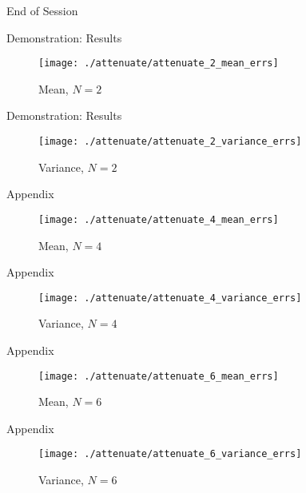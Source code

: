 \documentclass[t,9pt,svgnames]{beamer}
\begin{document}
\begin{frame}{End of Session}
\end{frame}

\begin{frame}{Demonstration: Results}
      \begin{figure}
        \centering
        \texttt{[image: ./attenuate/attenuate\_2\_mean\_errs]}
        \caption{Mean, $N=2$}
      \end{figure}
\end{frame}
\begin{frame}{Demonstration: Results}
      \begin{figure}
        \centering
        \texttt{[image: ./attenuate/attenuate\_2\_variance\_errs]}
        \caption{Variance, $N=2$}
      \end{figure}
\end{frame}

\begin{frame}{Appendix}
      \begin{figure}
        \centering
        \texttt{[image: ./attenuate/attenuate\_4\_mean\_errs]}
        \caption{Mean, $N=4$}
      \end{figure}
\end{frame}
\begin{frame}{Appendix}
      \begin{figure}
        \centering
        \texttt{[image: ./attenuate/attenuate\_4\_variance\_errs]}
        \caption{Variance, $N=4$}
      \end{figure}
\end{frame}

\begin{frame}{Appendix}
  \begin{figure}
    \centering
    \texttt{[image: ./attenuate/attenuate\_6\_mean\_errs]}
    \caption{Mean, $N=6$}
  \end{figure}
\end{frame}
\begin{frame}{Appendix}
  \begin{figure}
    \centering
    \texttt{[image: ./attenuate/attenuate\_6\_variance\_errs]}
    \caption{Variance, $N=6$}
  \end{figure}
\end{frame}
\end{document}
